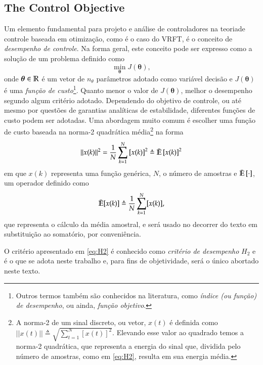 \subsection{The Control Objective}%
\label{sub:the_reference_model}

Um elemento fundamental para projeto e análise de controladores na teoriade controle baseada em otimização, como é o caso do VRFT, é o conceito de \textit{desempenho de controle}. Na forma geral, este conceito pode ser expresso como a solução de um problema definido como
\begin{equation}
   \min_{\bm{\theta}} J(\bm{\theta}),
\end{equation}
onde $\bm{\theta} \in \mathbb{R}$ é um vetor de $n_{\theta}$ parâmetros adotado como variável decisão e $J(\bm{\theta})$ é uma \textit{função de custo}\footnote{Outros termos também são conhecidos na literatura, como \textit{índice (ou função) de desempenho}, ou ainda, \textit{função objetivo}.}. Quanto menor o valor de $J(\bm{\theta})$, melhor o desempenho segundo algum critério adotado. Dependendo do objetivo de controle, ou até mesmo por questões de garantias analíticas de estabilidade, diferentes funções de custo podem ser adotadas. Uma abordagem muito comum é escolher uma função de custo baseada na  norma-2 quadrática média\footnote{A norma-2 de um sinal discreto, ou vetor, $x(t)$ é definida como $||x(t)|| \triangleq \sqrt{ \sum_{t=1}^{N} [x(t)]^{2} }$. Elevando esse valor ao quadrado temos a norma-2 quadrática, que representa a energia do sinal que, dividida pelo número de amostras, como em \eqref{eq:H2}, resulta em sua energia média.}
na forma
\begin{equation}
   ||x(k)||^{2} =\frac{1}{N}\sum_{k=1}^{N} \left[ x(k) \right]^{2} \triangleq \bar{\mathbb{E}} \left[ x(k) \right]^{2}
   \label{eq:H2}
\end{equation}
em que $x(k)$ representa uma função genérica, $N$, o número de amostras e $\bar{\mathbb{E}}\left[ \cdot \right] $, um operador definido como
\begin{equation}
   \bar{\mathbb{E}}[x(k)] \triangleq \frac{1}{N}\sum_{k=1}^{N} [x(k)],
\end{equation}
que representa o cálculo da média amostral, e será usado no decorrer do texto em substituição ao somatório, por conveniência.

O critério apresentado em \eqref{eq:H2} é conhecido como \textit{critério de desempenho} $H_2$ e é o que se adota neste trabalho e, para fins de objetividade, será o único abortado neste texto.

